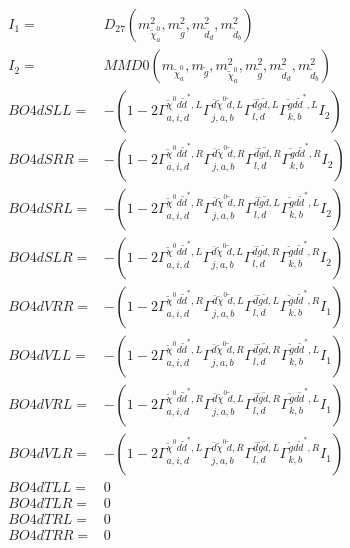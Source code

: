\documentclass[A4,landscape]{article}
\begin{document}
\begin{align} 
I_1 = & D_{27}(m^2_{\tilde{\chi}^0_{{a}}}, m^2_{\tilde{g}}, m^2_{\tilde{d}_{{d}}}, m^2_{\tilde{d}_{{b}}}) \\ 
I_2 = & MMD0(m_{\tilde{\chi}^0_{{a}}}, m_{\tilde{g}}, m^2_{\tilde{\chi}^0_{{a}}}, m^2_{\tilde{g}}, m^2_{\tilde{d}_{{d}}}, m^2_{\tilde{d}_{{b}}}) \\ 
  BO4dSLL= & -(1
-
2 \Gamma^{\tilde{\chi}^0 d \tilde{d}^*,L}_{a, i, d} \Gamma^{\bar{d}\tilde{\chi}^0 \tilde{d} ,L}_{j, a, b} \Gamma^{\bar{d}\tilde{g} \tilde{d} ,L}_{l, d} \Gamma^{\tilde{g} d \tilde{d}^*,L}_{k, b} I_2) \\ 
  BO4dSRR= & -(1
-
2 \Gamma^{\tilde{\chi}^0 d \tilde{d}^*,R}_{a, i, d} \Gamma^{\bar{d}\tilde{\chi}^0 \tilde{d} ,R}_{j, a, b} \Gamma^{\bar{d}\tilde{g} \tilde{d} ,R}_{l, d} \Gamma^{\tilde{g} d \tilde{d}^*,R}_{k, b} I_2) \\ 
  BO4dSRL= & -(1
-
2 \Gamma^{\tilde{\chi}^0 d \tilde{d}^*,R}_{a, i, d} \Gamma^{\bar{d}\tilde{\chi}^0 \tilde{d} ,R}_{j, a, b} \Gamma^{\bar{d}\tilde{g} \tilde{d} ,L}_{l, d} \Gamma^{\tilde{g} d \tilde{d}^*,L}_{k, b} I_2) \\ 
  BO4dSLR= & -(1
-
2 \Gamma^{\tilde{\chi}^0 d \tilde{d}^*,L}_{a, i, d} \Gamma^{\bar{d}\tilde{\chi}^0 \tilde{d} ,L}_{j, a, b} \Gamma^{\bar{d}\tilde{g} \tilde{d} ,R}_{l, d} \Gamma^{\tilde{g} d \tilde{d}^*,R}_{k, b} I_2) \\ 
  BO4dVRR= & -(1
-
2 \Gamma^{\tilde{\chi}^0 d \tilde{d}^*,R}_{a, i, d} \Gamma^{\bar{d}\tilde{\chi}^0 \tilde{d} ,L}_{j, a, b} \Gamma^{\bar{d}\tilde{g} \tilde{d} ,L}_{l, d} \Gamma^{\tilde{g} d \tilde{d}^*,R}_{k, b} I_1) \\ 
  BO4dVLL= & -(1
-
2 \Gamma^{\tilde{\chi}^0 d \tilde{d}^*,L}_{a, i, d} \Gamma^{\bar{d}\tilde{\chi}^0 \tilde{d} ,R}_{j, a, b} \Gamma^{\bar{d}\tilde{g} \tilde{d} ,R}_{l, d} \Gamma^{\tilde{g} d \tilde{d}^*,L}_{k, b} I_1) \\ 
  BO4dVRL= & -(1
-
2 \Gamma^{\tilde{\chi}^0 d \tilde{d}^*,R}_{a, i, d} \Gamma^{\bar{d}\tilde{\chi}^0 \tilde{d} ,L}_{j, a, b} \Gamma^{\bar{d}\tilde{g} \tilde{d} ,R}_{l, d} \Gamma^{\tilde{g} d \tilde{d}^*,L}_{k, b} I_1) \\ 
  BO4dVLR= & -(1
-
2 \Gamma^{\tilde{\chi}^0 d \tilde{d}^*,L}_{a, i, d} \Gamma^{\bar{d}\tilde{\chi}^0 \tilde{d} ,R}_{j, a, b} \Gamma^{\bar{d}\tilde{g} \tilde{d} ,L}_{l, d} \Gamma^{\tilde{g} d \tilde{d}^*,R}_{k, b} I_1) \\ 
  BO4dTLL= & 0 \\ 
  BO4dTLR= & 0 \\ 
  BO4dTRL= & 0 \\ 
  BO4dTRR= & 0 \\ 
\end{align} 
\end{document}
